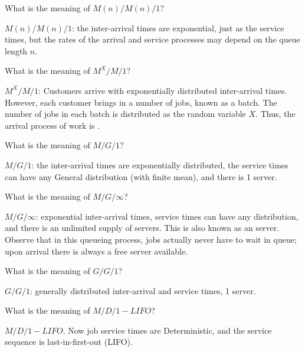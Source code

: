 \begin{exercise}
  What is the meaning of $M(n)/M(n)/1$?
  \begin{solution}
$M(n)/M(n)/1$: the inter-arrival times are exponential, just as
  the service times, but the rates of the arrival and service processes
  may depend on the queue length $n$. 
  \end{solution}
\end{exercise}


\begin{exercise}
  What is the meaning of $M^X/M/1$?
  \begin{solution}
 $M^X/M/1$: Customers arrive with exponentially distributed
  inter-arrival times. However, each customer brings in a number of
  jobs, known as a batch. The number of jobs in each batch is
  distributed as the random variable $X$. Thus, the arrival process of
  work is .
  \end{solution}
\end{exercise}

\begin{exercise}
  What is the meaning of $M/G/1$?
  \begin{solution}
$M/G/1$: the inter-arrival times are exponentially distributed,
  the service times can have any General distribution (with
  finite mean), and there is 1 server.
  \end{solution}
\end{exercise}


\begin{exercise}
  What is the meaning of $M/G/\infty$?
  \begin{solution}
 $M/G/\infty$: exponential inter-arrival times, service times can
  have any distribution, and there is an unlimited supply of
  servers. This is also known as an  server. Observe
  that in this queueing process, jobs actually never have to wait in
  queue; upon arrival there is always a free server available.
  \end{solution}
\end{exercise}

\begin{exercise}
  What is the meaning of $G/G/1$?
  \begin{solution}
 $G/G/1$: generally distributed inter-arrival and service times, 1 server.
  \end{solution}
\end{exercise}

\begin{exercise}
  What is the meaning of $M/D/1-LIFO$?
  \begin{solution}
 $M/D/1-LIFO$.  Now job service times are Deterministic, and the service sequence is last-in-first-out (LIFO).
  \end{solution}
\end{exercise}

